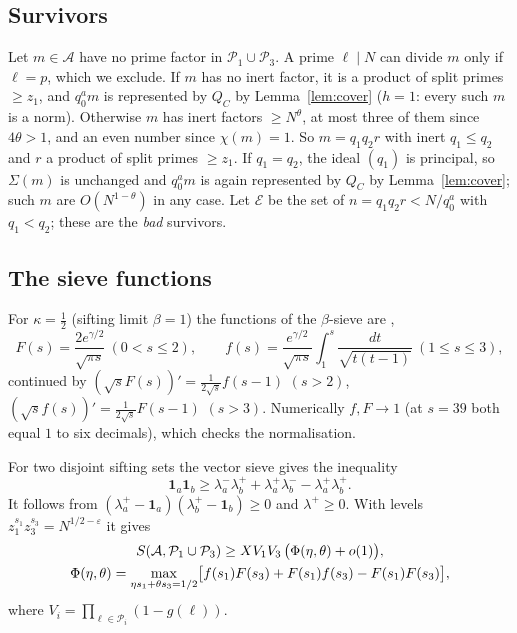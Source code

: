 \documentclass[11pt]{amsart}
\theoremstyle{remark}
\newcommand{\e}{\varepsilon}
\newcommand{\cA}{\mathcal A}
\newcommand{\cE}{\mathcal E}
\newcommand{\cP}{\mathcal P}
\begin{document}
\subsection{Survivors}
Let $m\in\cA$ have no prime factor in $\cP_1\cup\cP_3$. A prime $\ell\mid N$ can divide $m$ only if $\ell=p$, which we exclude. If $m$ has no inert factor, it is a product of split primes $\ge z_1$, and $q_0^am$ is represented by $Q_C$ by Lemma~\ref{lem:cover} ($h=1$: every such $m$ is a norm). Otherwise $m$ has inert factors $\ge N^\theta$, at most three of them since $4\theta>1$, and an even number since $\chi(m)=1$. So $m=q_1q_2r$ with inert $q_1\le q_2$ and $r$ a product of split primes $\ge z_1$. If $q_1=q_2$, the ideal $(q_1)$ is principal, so $\Sigma(m)$ is unchanged and $q_0^am$ is again represented by $Q_C$ by Lemma~\ref{lem:cover}; such $m$ are $O(N^{1-\theta})$ in any case. Let $\cE$ be the set of $n=q_1q_2r<N/q_0^a$ with $q_1<q_2$; these are the \emph{bad} survivors.

\subsection{The sieve functions}
For $\kappa=\frac12$ (sifting limit $\beta=1$) the functions of the $\beta$-sieve are \cite{Iw76},\cite[Ch.~14]{FI}
\[
F(s)=\frac{2e^{\gamma/2}}{\sqrt{\pi s}}\ (0<s\le2),\qquad f(s)=\frac{e^{\gamma/2}}{\sqrt{\pi s}}\int_1^s\frac{dt}{\sqrt{t(t-1)}}\ (1\le s\le3),
\]
continued by $(\sqrt sF(s))'=\frac1{2\sqrt s}f(s-1)$ $(s>2)$, $(\sqrt sf(s))'=\frac1{2\sqrt s}F(s-1)$ $(s>3)$. Numerically $f,F\to1$ (at $s=39$ both equal $1$ to six decimals), which checks the normalisation.

For two disjoint sifting sets the vector sieve \cite{BF} gives the inequality
\[
\mathbf 1_a\mathbf 1_b\ge\lambda_a^-\lambda_b^++\lambda_a^+\lambda_b^--\lambda_a^+\lambda_b^+ .
\]
It follows from $(\lambda_a^+-\mathbf 1_a)(\lambda_b^+-\mathbf 1_b)\ge0$ and $\lambda^+\ge0$. With levels $z_1^{s_1}z_3^{s_3}=N^{1/2-\e}$ it gives
\begin{gather}
S(\cA,\cP_1\cup\cP_3)\ge XV_1V_3\,\bigl(\Phi(\eta,\theta)+o(1)\bigr),\label{eq:lower}\\
\Phi(\eta,\theta)=\max_{\eta s_1+\theta s_3=1/2}\bigl[f(s_1)F(s_3)+F(s_1)f(s_3)-F(s_1)F(s_3)\bigr],\notag
\end{gather}
where $V_i=\prod_{\ell\in\cP_i}(1-g(\ell))$.
\end{document}
